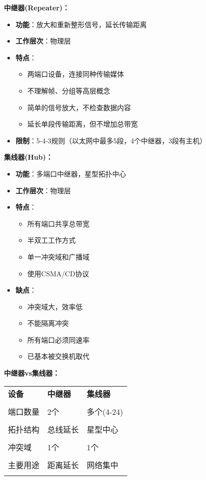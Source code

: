 \documentclass[lang=cn,newtx,10pt,scheme=chinese]{../../elegantbook}
\begin{document}
\textbf{中继器(Repeater)：}
\begin{itemize}
  \item \textbf{功能}：放大和重新整形信号，延长传输距离
  \item \textbf{工作层次}：物理层
  \item \textbf{特点}：
    \begin{itemize}
      \item 两端口设备，连接同种传输媒体
      \item 不理解帧、分组等高层概念
      \item 简单的信号放大，不检查数据内容
      \item 延长单段传输距离，但不增加总带宽
    \end{itemize}
  \item \textbf{限制}：5-4-3规则（以太网中最多5段，4个中继器，3段有主机）
\end{itemize}

\textbf{集线器(Hub)：}
\begin{itemize}
  \item \textbf{功能}：多端口中继器，星型拓扑中心
  \item \textbf{工作层次}：物理层
  \item \textbf{特点}：
    \begin{itemize}
      \item 所有端口共享总带宽
      \item 半双工工作方式
      \item 单一冲突域和广播域
      \item 使用CSMA/CD协议
    \end{itemize}
  \item \textbf{缺点}：
    \begin{itemize}
      \item 冲突域大，效率低
      \item 不能隔离冲突
      \item 所有端口必须同速率
      \item 已基本被交换机取代
    \end{itemize}
\end{itemize}

\textbf{中继器vs集线器：}
\begin{longtable}{@{}p{3cm}p{5cm}p{5cm}@{}}
\toprule
\textbf{设备} & \textbf{中继器} & \textbf{集线器} \\\\ \midrule
\endhead

端口数量 & 2个 & 多个(4-24) \\\\
拓扑结构 & 总线延长 & 星型中心 \\\\
冲突域 & 1个 & 1个 \\\\
主要用途 & 距离延长 & 网络集中 \\\\

\bottomrule
\end{longtable}
\end{document}
